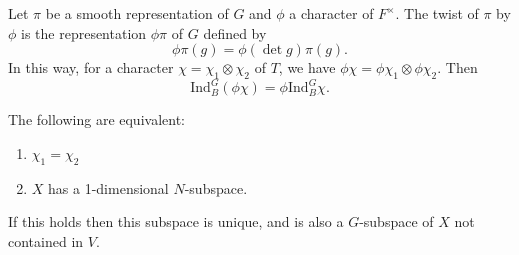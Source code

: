 \begin{defn}
    Let $\pi$ be a smooth representation of $G$ and $\phi$ a character of $F^\times$. The twist of $\pi$ by $\phi$ is the representation $\phi\pi$ of $G$ defined by 
    $$\phi \pi(g) = \phi (\det g)\pi(g).$$
    In this way, for a character $\chi=\chi_1 \otimes \chi_2$ of $T$, we have $\phi\chi = \phi\chi_1 \otimes \phi\chi_2$. Then 
    $$\mathrm{Ind}_B^G(\phi\chi) = \phi \mathrm{Ind}_B^G \chi.$$
\end{defn}

\begin{prop}
    The following are equivalent:
    \begin{enumerate}
        \item $\chi_1=\chi_2$
        \item $X$ has a 1-dimensional $N$-subspace.
    \end{enumerate}
    If this holds then this subspace is unique, and is also a $G$-subspace of $X$ not contained in $V$.
\end{prop}
